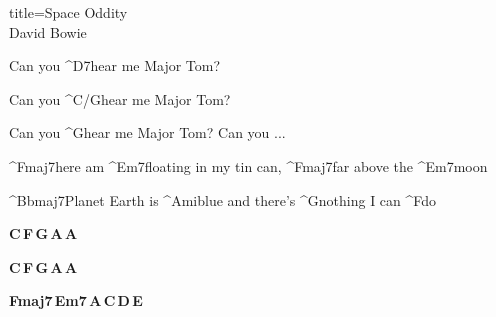 \begin{song}{title=\centering Space Oddity \\\normalsize David Bowie  \vspace*{-0.3cm}}
{	Can you ^{D7}hear me Major Tom? 

	Can you ^{C/G}hear me Major Tom? 

	Can you ^{G}hear me Major Tom? Can you ...


\sloka
	^{Fmaj7}here am ^{Em7}floating in my tin can, ^{Fmaj7}far above the ^{Em7}moon

	^{Bbmaj7}Planet Earth is ^{Ami}blue and there's ^{G}nothing I can ^{F}do

\textbf{C\,F\,G\,A\,A}

\textbf{C\,F\,G\,A\,A}

\textbf{Fmaj7\,Em7\,A\,C\,D\,E}


}
\setcounter{Slokočet}{0}
\end{song}

